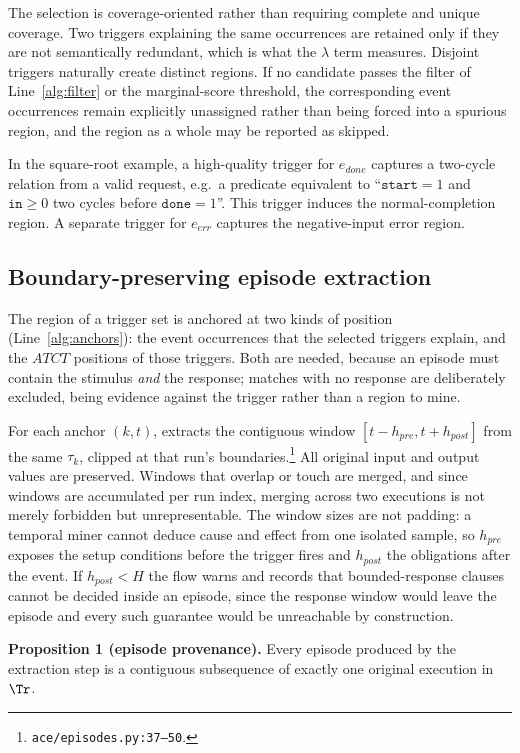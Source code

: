The selection is coverage-oriented rather than requiring complete and unique coverage. Two
triggers explaining the same occurrences are retained only if they are not semantically
redundant, which is what the $\lambda$ term measures. Disjoint triggers naturally create
distinct regions. If no candidate passes the filter of Line~\ref{alg:filter} or the
marginal-score threshold, the corresponding event occurrences remain explicitly unassigned
rather than being forced into a spurious region, and the region as a whole may be reported
as skipped.

In the square-root example, a high-quality trigger for $e_{done}$ captures a two-cycle
relation from a valid request, e.g.\ a predicate equivalent to ``$\texttt{start}=1$ and
$\texttt{in}\ge0$ two cycles before $\texttt{done}=1$''. This trigger induces the
normal-completion region. A separate trigger for $e_{err}$ captures the negative-input error
region.

\subsection{Boundary-preserving episode extraction}
The region of a trigger set is anchored at two kinds of position (Line~\ref{alg:anchors}):
the event occurrences that the selected triggers explain, and the $ATCT$ positions of those
triggers. Both are needed, because an episode must contain the stimulus \emph{and} the
response; matches with no response are deliberately excluded, being evidence against the
trigger rather than a region to mine.

For each anchor $(k,t)$, \ACE{} extracts the contiguous window $[t-h_{pre},t+h_{post}]$ from
the same $\tau_k$, clipped at that run's boundaries.\footnote{\texttt{ace/episodes.py:37--50}.}
All original input and output values are preserved. Windows that overlap or touch are merged,
and since windows are accumulated per run index, merging across two executions is not merely
forbidden but unrepresentable. The window sizes are not padding: a temporal miner cannot
deduce cause and effect from one isolated sample, so $h_{pre}$ exposes the setup conditions
before the trigger fires and $h_{post}$ the obligations after the event. If $h_{post}<H$ the
flow warns and records that bounded-response clauses cannot be decided inside an episode,
since the response window would leave the episode and every such guarantee would be
unreachable by construction.

\textbf{Proposition 1 (episode provenance).} Every episode produced by the extraction step is
a contiguous subsequence of exactly one original execution in $\Tr$.

